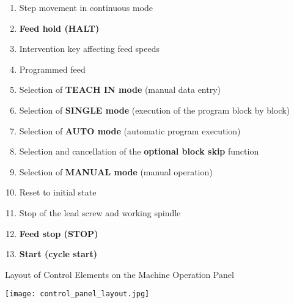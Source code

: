 \begin{enumerate}
    \item Step movement in continuous mode
    \item \textbf{Feed hold (HALT)}
    \item Intervention key affecting feed speeds
    \item Programmed feed
    \item Selection of \textbf{TEACH IN mode} (manual data entry)
    \item Selection of \textbf{SINGLE mode} (execution of the program block by block)
    \item Selection of \textbf{AUTO mode} (automatic program execution)
    \item Selection and cancellation of the \textbf{optional block skip} function
    \item Selection of \textbf{MANUAL mode} (manual operation)
    \item Reset to initial state
    \item Stop of the lead screw and working spindle
    \item \textbf{Feed stop (STOP)}
    \item \textbf{Start (cycle start)}
\end{enumerate}

\newpage

Layout of Control Elements on the Machine Operation Panel

\begin{center}
    \hspace{-3.5cm} %
    \texttt{[image: control\_panel\_layout.jpg]}
\end{center}